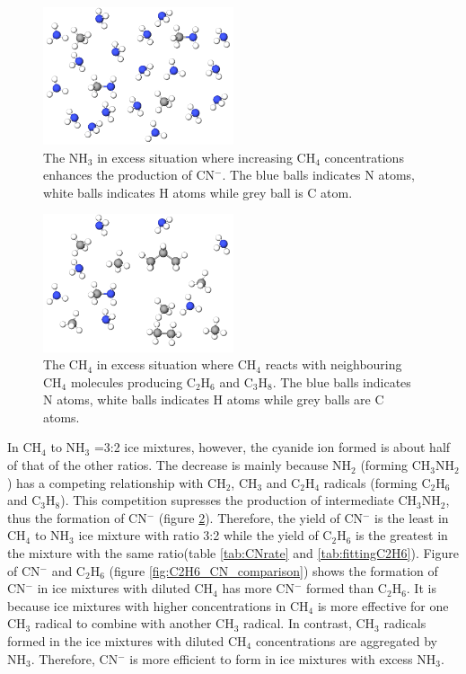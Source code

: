 \begin{figure}
\centering
\includegraphics[width=0.5\textwidth]{figures/ammonia_dominating.png}
\caption{The NH$_3$ in excess situation where increasing CH$_4$ concentrations enhances the production of CN$^-$. The blue balls indicates N atoms, white balls indicates H atoms while grey ball is C atom.}
\label{fig:NH3_dominated}
\end{figure}


\begin{figure}
\centering
\includegraphics[width=0.5\textwidth]{figures/methane_dominating.png}
\caption{The CH$_4$ in excess situation where CH$_4$ reacts with neighbouring CH$_4$ molecules producing C$_2$H$_6$ and C$_3$H$_8$. The blue balls indicates N atoms, white balls indicates H atoms while grey balls are C atoms.}
\label{fig:CH4_dominated}
\end{figure}

In CH$_4$ to NH$_3$ =3:2 ice mixtures, however, the cyanide ion formed is about half of that of the other ratios. The decrease is mainly because NH$_2$ (forming CH$_3$NH$_2$) has a competing relationship with CH$_2$, CH$_3$ and C$_2$H$_4$ radicals (forming C$_2$H$_6$ and C$_3$H$_8$). This competition supresses the production of intermediate CH$_3$NH$_2$, thus the formation of CN$^-$ (figure \ref{fig:CH4_dominated}). Therefore, the yield of CN$^-$ is the least in CH$_4$ to NH$_3$ ice mixture with ratio 3:2 while the yield of C$_2$H$_6$ is the greatest in the mixture with the same ratio(table \ref{tab:CNrate} and \ref{tab:fittingC2H6}). Figure of CN$^-$ and C$_2$H$_6$ (figure \ref{fig:C2H6_CN_comparison}) shows the formation of CN$^-$ in ice mixtures with diluted CH$_4$ has more CN$^-$ formed than C$_2$H$_6$. It is because ice mixtures with higher concentrations in CH$_4$ is more effective for one CH$_3$ radical to combine with another CH$_3$ radical. In contrast, CH$_3$ radicals formed in the ice mixtures with diluted CH$_4$ concentrations are aggregated by NH$_3$. Therefore, CN$^-$ is more efficient to form in ice mixtures with excess NH$_3$.\\

